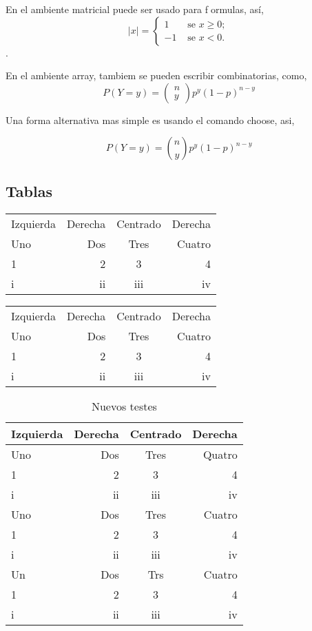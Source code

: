\documentclass{article}
\begin{document}
En el ambiente matricial puede ser usado para formulas, así,
\[|x| = \left\{ \begin{array}{ll}
1 & \mbox{ se } x \geq 0; \\
-1 & \mbox{ se } x < 0. \end{array} \right. \].

En el ambiente array, tambiem se pueden escribir combinatorias, como, \[ P(Y = y) = \left( \begin{array}{c}
n \\
y \end{array} \right)p^y (1-p)^{n-y} \]

Una forma alternativa mas simple es usando el comando choose, asi, \choose

\[ P(Y = y) = {n \choose y} p^y (1-p)^{n-y} \]


\subsection{Tablas}
\begin{tabular}{lrcr}
Izquierda & Derecha & Centrado & Derecha \\
Uno & Dos & Tres & Cuatro \\
1 & 2 & 3 & 4 \\
i & ii & iii & iv
\end{tabular}

\vspace{1cm}
\begin{tabular}{|l|r|c|r|}
\hline
Izquierda & Derecha & Centrado & Derecha \\
Uno & Dos & Tres & Cuatro \\ \hline
1 & 2 & 3 & 4 \\ \hline
i & ii & iii & iv \\ \hline
\end{tabular}

\vspace{1cm}

\def\tablename{Tabla}%
\begin{table}[!htb]
\caption{ Nuevos testes } \vspace*{0.2cm}
\centering
\begin{tabular}{l|r|c|r} \hline
Izquierda & Derecha & Centrado & Derecha \\ \hline \hline
Uno & Dos & Tres & Quatro \\
1 & 2 & 3 & 4 \\
i & ii & iii & iv \\
Uno & Dos & Tres & Cuatro \\
1 & 2 & 3 & 4 \\
i & ii & iii & iv \\
Un & Dos & Trs & Cuatro \\
1 & 2 & 3 & 4 \\
i & ii & iii & iv \\ \hline
\end{tabular}
\label{Tabe}
\end{table}
\end{document}
